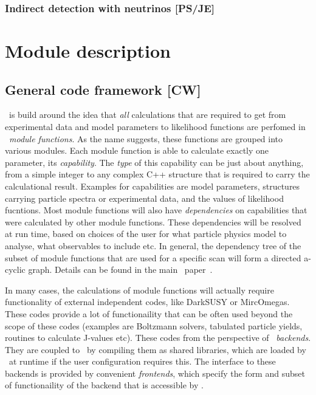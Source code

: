\subsubsection{Indirect detection with neutrinos {\bf [PS/JE]}}
\label{phys_nu}




\section{Module description}
\label{code}


\subsection{General code framework {\bf [CW]}}
\label{code_gen}

\GB\ is build around the idea that \emph{all} calculations that are required to
get from experimental data and model parameters to likelihood functions are
perfomed in \GB\ \emph{module functions}.  As the name suggests, these
functions are grouped into various modules.  Each module function is able to
calculate exactly one parameter, its \emph{capability}.  The \emph{type} of
this capability can be just about anything, from a simple integer to any
complex C++ structure that is required to carry the calculational result.
Examples for capabilities are model parameters, structures carrying particle
spectra or experimental data, and the values of likelihood fucntions.  Most
module functions will also have \emph{dependencies} on capabilities that were
calculated by other module functions.  These dependencies will be resolved at
run time, based on choices of the user for what particle physics model to
analyse, what observables to include etc.  In general, the dependency tree of
the subset of module functions that are used for a specific scan will form a
directed a-cyclic graph.  Details can be found in the main \GB\
paper~\cite{123}.

In many cases, the calculations of module functions will actually require
functionality of external independent codes, like DarkSUSY or MircOmegas.
These codes provide a lot of functionaility that can be often used beyond the
scope of these codes (examples are Boltzmann solvers, tabulated particle
yields, routines to calculate J-values etc).  These codes from the perspective
of \GB\ \emph{backends}.  They are coupled to \GB\ by compiling them as shared
libraries, which are loaded by \GB\ at runtime if the user configuration
requires this.  The interface to these backends is provided by convenient
\emph{frontends}, which specify the form and subset of functionaility of the
backend that is accessible by \GB.

